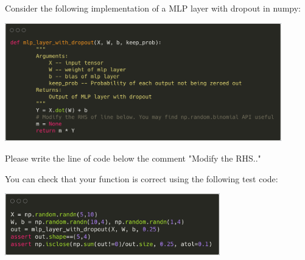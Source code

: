 \begin{frame}
\section{}
Consider the following implementation of a MLP layer with dropout in numpy:

\includegraphics[width=0.9\textwidth]{images/quiz_4_4_3_1a.png}

Please write the line of code below the comment "Modify the RHS.."

You can check that your function is correct using the following test code:

\includegraphics[width=0.7\textwidth]{images/quiz_4_4_3_1b.png}



\end{frame}



